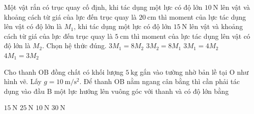 \begin{ex}
	Một vật rắn có trục quay cố định, khi tác dụng một lực có độ lớn $\SI{10}{\newton}$ lên vật và khoảng cách từ giá của lực đến trục quay là $\SI{20}{\centi\meter}$ thì moment của lực tác dụng lên vật có độ lớn là $M_1$, khi tác dụng một lực có độ lớn $\SI{15}{\newton}$ lên vật và khoảng cách từ giá của lực đến trục quay là $\SI{5}{\centi\meter}$ thì moment của lực tác dụng lên vật có độ lớn là $M_2$. Chọn hệ thức đúng.
	\choice
	{\True $3M_1=8M_2$}
	{$3M_2=8M_1$}
	{$3M_1=4M_2$}
	{$4M_1=3M_2$}
	\loigiai{}
\end{ex}
\begin{ex}
	Cho thanh OB đồng chất có khối lượng $\SI{5}{\kilogram}$ gắn vào tường nhờ bản lề tại O như hình vẽ. Lấy $g=\SI{10}{\meter/\second^2}$. Để thanh OB nằm ngang cân bằng thì cần phải tác dụng vào đầu B một lực hướng lên vuông góc với thanh và có độ lớn bằng
	\begin{center}
	\end{center}
	\choice
	{$\SI{15}{\newton}$}
	{\True $\SI{25}{\newton}$}
	{$\SI{10}{\newton}$}
	{$\SI{30}{\newton}$}
	\loigiai{}
\end{ex}

